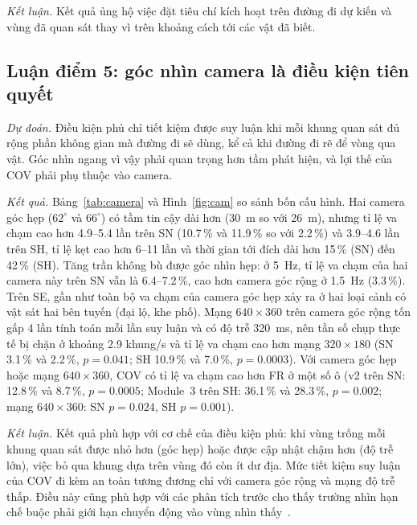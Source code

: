 \documentclass[11pt,a4paper]{article}
\theoremstyle{plain}
\theoremstyle{definition}
\theoremstyle{remark}
\begin{document}
\emph{Kết luận.} Kết quả ủng hộ việc đặt tiêu chí kích hoạt trên đường đi dự kiến và vùng đã quan sát thay vì trên khoảng cách tới các vật đã biết.

\subsection{Luận điểm 5: góc nhìn camera là điều kiện tiên quyết}\label{sec:r5}

\emph{Dự đoán.} Điều kiện phủ chỉ tiết kiệm được suy luận khi mỗi khung quan sát đủ rộng phần không gian mà đường đi sẽ dùng, kể cả khi đường đi rẽ để vòng qua vật. Góc nhìn ngang vì vậy phải quan trọng hơn tầm phát hiện, và lợi thế của COV phải phụ thuộc vào camera.

\emph{Kết quả.} Bảng~\ref{tab:camera} và Hình~\ref{fig:cam} so sánh bốn cấu hình. Hai camera góc hẹp ($62^\circ$ và $66^\circ$) có tầm tin cậy dài hơn (30~m so với 26~m), nhưng tỉ lệ va chạm cao hơn 4.9--5.4 lần trên SN (10.7\,\% và 11.9\,\% so với 2.2\,\%) và 3.9--4.6 lần trên SH, tỉ lệ kẹt cao hơn 6--11 lần và thời gian tới đích dài hơn 15\,\% (SN) đến 42\,\% (SH). Tăng trần không bù được góc nhìn hẹp: ở 5~Hz, tỉ lệ va chạm của hai camera này trên SN vẫn là 6.4--7.2\,\%, cao hơn camera góc rộng ở 1.5~Hz (3.3\,\%). Trên SE, gần như toàn bộ va chạm của camera góc hẹp xảy ra ở hai loại cảnh có vật sát hai bên tuyến (đại lộ, khe phố). Mạng $640\times360$ trên camera góc rộng tốn gấp 4 lần tính toán mỗi lần suy luận và có độ trễ 320~ms, nên tần số chụp thực tế bị chặn ở khoảng 2.9 khung/s và tỉ lệ va chạm cao hơn mạng $320\times180$ (SN 3.1\,\% và 2.2\,\%, $p = 0.041$; SH 10.9\,\% và 7.0\,\%, $p = 0.0003$). Với camera góc hẹp hoặc mạng $640\times360$, COV có tỉ lệ va chạm cao hơn FR ở một số ô (v2 trên SN: 12.8\,\% và 8.7\,\%, $p = 0.0005$; Module~3 trên SH: 36.1\,\% và 28.3\,\%, $p = 0.002$; mạng $640\times360$: SN $p = 0.024$, SH $p = 0.001$).

\emph{Kết luận.} Kết quả phù hợp với cơ chế của điều kiện phủ: khi vùng trống mỗi khung quan sát được nhỏ hơn (góc hẹp) hoặc được cập nhật chậm hơn (độ trễ lớn), việc bỏ qua khung dựa trên vùng đó còn ít dư địa. Mức tiết kiệm suy luận của COV đi kèm an toàn tương đương chỉ với camera góc rộng và mạng độ trễ thấp. Điều này cũng phù hợp với các phân tích trước cho thấy trường nhìn hạn chế buộc phải giới hạn chuyển động vào vùng nhìn thấy~\cite{misyats2025}.
\end{document}
